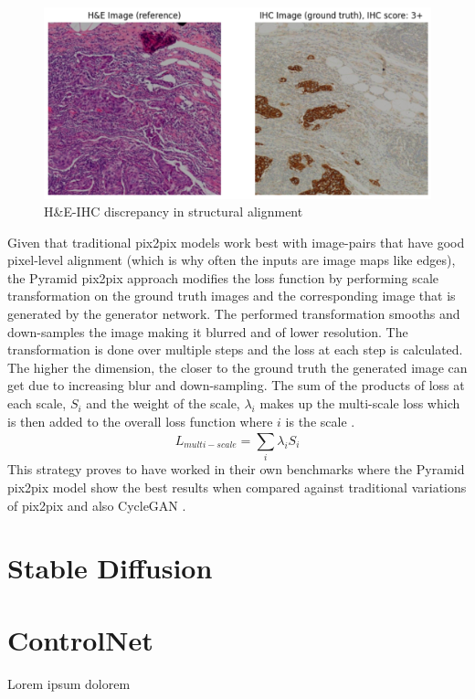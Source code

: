\begin{figure}[h]
    \centering
    \includegraphics[width=1\linewidth]{2_LiteratureSurvey/figures/he-ihc-alignmentIssue.png}
    \caption{H\&E-IHC discrepancy in structural alignment}
    \label{fig:he-ihc-alignment-issue-example}
\end{figure}
Given that traditional pix2pix models work best with image-pairs that have good pixel-level alignment (which is why often the inputs are image maps like edges), the Pyramid pix2pix approach modifies the loss function by performing scale transformation on the ground truth images and the corresponding image that is generated by the generator network. The performed transformation smooths and down-samples the image making it blurred and of lower resolution. The transformation is done over multiple steps and the loss at each step is calculated. The higher the dimension, the closer to the ground truth the generated image can get due to increasing blur and down-sampling. The sum of the products of  loss at each scale, $S_{i}$ and the weight of the scale, $\lambda_{i}$ makes up the multi-scale loss which is then added to the overall loss function where $i$ is the scale  \parencite[Equation 2, p. 6]{Liu2022BCI:Pix2pix}. 
\begin{equation}\label{eq:multi-scale-loss}
L_{multi−scale} = \sum_{i}^{} \lambda_{i}S_{i}
\end{equation}
This strategy proves to have worked in their own benchmarks where the Pyramid pix2pix model show the best results when compared against traditional variations of pix2pix and also CycleGAN \parencite[Table 1, p. 7]{Liu2022BCI:Pix2pix}.  

\section{Stable Diffusion}



\section{ControlNet}

Lorem ipsum dolorem



